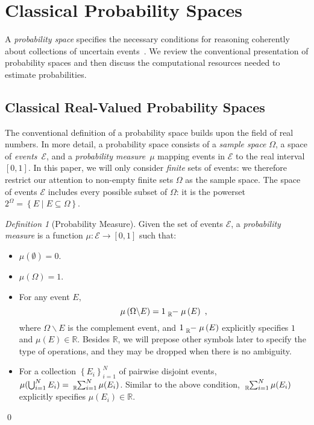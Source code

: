\documentclass{article}
\theoremstyle{remark}
\newtheorem{definition}{Definition}
\newcommand{\events}{\ensuremath{\mathcal{E}}}
\newcommand{\pmeas}{\ensuremath{\mu}}
\begin{document}
\section{Classical Probability Spaces}
  
A \emph{probability space} specifies the necessary conditions for
reasoning coherently about collections of uncertain events~\cite{Kolmogorov1950,Shafer1976,Griffiths2003,Swart2013}.
We review the conventional presentation of probability spaces and
then discuss the computational resources needed to estimate probabilities.



\subsection{Classical Real-Valued Probability Spaces}

The conventional definition of a probability space builds upon the
field of real numbers. In more detail, a probability space consists
of a \emph{sample space} $\Omega$, a space of \emph{events}~$\events$,
and a \emph{probability measure}~$\pmeas$ mapping events in $\events$
to the real interval $[0,1]$. In this paper, we will only consider
\emph{finite} sets of events: we therefore restrict our attention
to non-empty finite sets $\Omega$ as the sample space. The space
of events $\events$ includes every possible subset of $\Omega$:
it is the powerset~$2^{\Omega}=\left\{ E\middle|E\subseteq\Omega\right\} $. 

\begin{definition}[Probability Measure]\label{def:ClassicalProbabilitySpace}
Given the set of events $\events$, a \emph{probability measure} is
a function $\pmeas:\events\rightarrow[0,1]$ such that: 
\begin{itemize}
\item $\pmeas(\emptyset)=0$. 
\item $\pmeas(\Omega)=1$. 
\item For any event $E$, 
\begin{equation}
\pmeas\left(\Omega\backslash E\right)=1\tensor*[_{\mathbb{R}}]{-}{}\pmeas\left(E\right)\textrm{ ,}\label{eq:ClassicalReal-valuedProbability-Complement}
\end{equation}
where $\Omega\backslash E$ is the complement event, and $1\tensor*[_{\mathbb{R}}]{-}{}\pmeas\left(E\right)$
explicitly specifies $1$ and $\pmeas\left(E\right)\in\mathbb{R}$.
Besides $\mathbb{R}$, we will prepose other symbols later to specify
the type of operations, and they may be dropped when there is no ambiguity. 
\item For a collection $\left\{ E_{i}\right\} _{i=1}^{N}$ of pairwise disjoint
events, $\pmeas(\bigcup_{i=1}^{N}E_{i})=\tensor*[_{\mathbb{R}}]{\sum}{_{i=1}^{N}}\pmeas(E_{i})$.
Similar to the above condition, $\tensor*[_{\mathbb{R}}]{\sum}{_{i=1}^{N}}\pmeas(E_{i})$
explicitly specifies $\pmeas(E_{i})\in\mathbb{R}$. 
\end{itemize}
\qed\end{definition}
\end{document}
